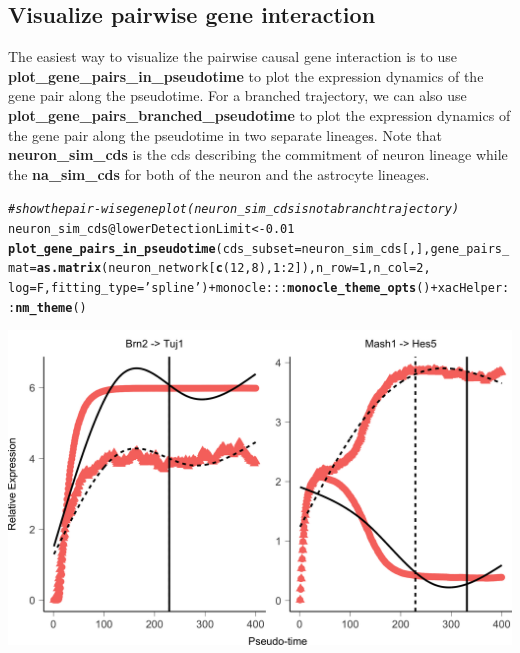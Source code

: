 \documentclass[10pt,oneside]{article}\usepackage[]{graphicx}\usepackage[]{color}
\makeatletter
\def\maxwidth{ %
  \ifdim\Gin@nat@width>\linewidth
    \linewidth
  \else
    \Gin@nat@width
  \fi
}
\newcommand{\hlnum}[1]{\textcolor[rgb]{0.686,0.059,0.569}{#1}}%
\newcommand{\hlstr}[1]{\textcolor[rgb]{0.192,0.494,0.8}{#1}}%
\newcommand{\hlcom}[1]{\textcolor[rgb]{0.678,0.584,0.686}{\textit{#1}}}%
\newcommand{\hlopt}[1]{\textcolor[rgb]{0,0,0}{#1}}%
\newcommand{\hlstd}[1]{\textcolor[rgb]{0.345,0.345,0.345}{#1}}%
\newcommand{\hlkwb}[1]{\textcolor[rgb]{0.69,0.353,0.396}{#1}}%
\newcommand{\hlkwc}[1]{\textcolor[rgb]{0.333,0.667,0.333}{#1}}%
\newcommand{\hlkwd}[1]{\textcolor[rgb]{0.737,0.353,0.396}{\textbf{#1}}}%
\newenvironment{kframe}{%
 \def\at@end@of@kframe{}%
 \ifinner\ifhmode%
  \def\at@end@of@kframe{\end{minipage}}%
  \begin{minipage}{\columnwidth}%
 \fi\fi%
 \def\FrameCommand##1{\hskip\@totalleftmargin \hskip-\fboxsep
 \colorbox{shadecolor}{##1}\hskip-\fboxsep
     \hskip-\linewidth \hskip-\@totalleftmargin \hskip\columnwidth}%
 \MakeFramed {\advance\hsize-\width
   \@totalleftmargin\z@ \linewidth\hsize
   \@setminipage}}%
 {\par\unskip\endMakeFramed%
 \at@end@of@kframe}
\newenvironment{knitrout}{}{} %
\makeatother
\begin{document}
\subsection{Visualize pairwise gene interaction}

The easiest way to visualize the pairwise causal gene interaction is to use \textbf{plot\_gene\_pairs\_in\_pseudotime} to plot the expression dynamics of the gene pair along the pseudotime. For a branched trajectory, we can also use \textbf{plot\_gene\_pairs\_branched\_pseudotime} to plot the expression dynamics of the gene pair along the pseudotime in two separate lineages. Note that \textbf{neuron\_sim\_cds} is the cds describing the commitment of neuron lineage while the \textbf{na\_sim\_cds} for both of the neuron and the astrocyte lineages. 
\begin{knitrout}
\color{fgcolor}\begin{kframe}
\begin{alltt}
\hlcom{# show the pair-wise gene plot (neuron_sim_cds is not a branch trajectory)}
\hlstd{neuron_sim_cds}\hlopt{@}\hlkwc{lowerDetectionLimit} \hlkwb{<-} \hlnum{0.01}
\hlkwd{plot_gene_pairs_in_pseudotime}\hlstd{(}\hlkwc{cds_subset} \hlstd{= neuron_sim_cds[, ],} \hlkwc{gene_pairs_mat} \hlstd{=}  \hlkwd{as.matrix}\hlstd{(neuron_network[}\hlkwd{c}\hlstd{(}\hlnum{12}\hlstd{,} \hlnum{8}\hlstd{),} \hlnum{1}\hlopt{:}\hlnum{2}\hlstd{]),} \hlkwc{n_row} \hlstd{=} \hlnum{1}\hlstd{,} \hlkwc{n_col} \hlstd{=} \hlnum{2}\hlstd{,}
                              \hlkwc{log} \hlstd{= F,} \hlkwc{fitting_type} \hlstd{=} \hlstr{'spline'}\hlstd{)} \hlopt{+}  \hlstd{monocle}\hlopt{:::}\hlkwd{monocle_theme_opts}\hlstd{()} \hlopt{+} \hlstd{xacHelper}\hlopt{::}\hlkwd{nm_theme}\hlstd{()}
\end{alltt}
\end{kframe}

{\centering \includegraphics[width=\maxwidth]{figure/gene_pairwise_kinetic_plot-1} 

}
\end{knitrout}
\end{document}
